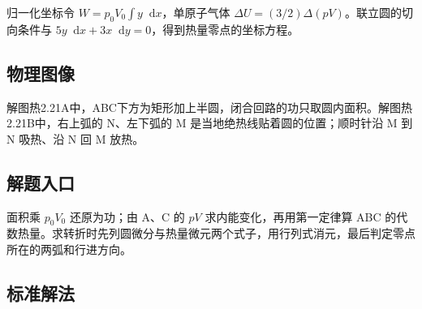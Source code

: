 \documentclass[UTF8,fontset=fandol,a4paper,11pt]{ctexart}
\newcommand{\dd}{\mathop{}\!\mathrm{d}}
\begin{document}
归一化坐标令 $W=p_0V_0\int y\dd x$，单原子气体 $\Delta U=(3/2)\Delta(pV)$。联立圆的切向条件与 $5y\dd x+3x\dd y=0$，得到热量零点的坐标方程。




\subsection*{物理图像}

解图热2.21A中，ABC下方为矩形加上半圆，闭合回路的功只取圆内面积。解图热2.21B中，右上弧的 N、左下弧的 M 是当地绝热线贴着圆的位置；顺时针沿 M 到 N 吸热、沿 N 回 M 放热。



\subsection*{解题入口}

面积乘 $p_0V_0$ 还原为功；由 A、C 的 $pV$ 求内能变化，再用第一定律算 ABC 的代数热量。求转折时先列圆微分与热量微元两个式子，用行列式消元，最后判定零点所在的两弧和行进方向。




\subsection*{标准解法}
\end{document}
